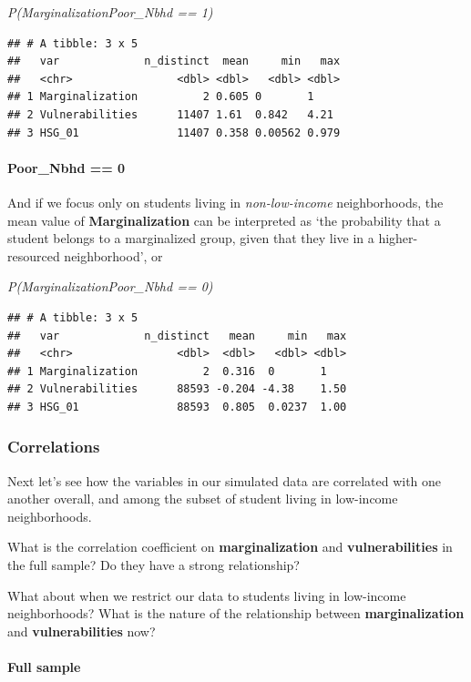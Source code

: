 \documentclass[
]{article}
\begin{document}
\emph{P(Marginalization\textbar Poor\_Nbhd == 1)}

\begin{verbatim}
## # A tibble: 3 x 5
##   var             n_distinct  mean     min   max
##   <chr>                <dbl> <dbl>   <dbl> <dbl>
## 1 Marginalization          2 0.605 0       1    
## 2 Vulnerabilities      11407 1.61  0.842   4.21 
## 3 HSG_01               11407 0.358 0.00562 0.979
\end{verbatim}

\paragraph{Poor\_Nbhd == 0}\label{poor_nbhd-0}

And if we focus only on students living in \emph{non-low-income}
neighborhoods, the mean value of \textbf{Marginalization} can be
interpreted as `the probability that a student belongs to a marginalized
group, given that they live in a higher-resourced neighborhood', or

\emph{P(Marginalization\textbar Poor\_Nbhd == 0)}

\begin{verbatim}
## # A tibble: 3 x 5
##   var             n_distinct   mean     min   max
##   <chr>                <dbl>  <dbl>   <dbl> <dbl>
## 1 Marginalization          2  0.316  0       1   
## 2 Vulnerabilities      88593 -0.204 -4.38    1.50
## 3 HSG_01               88593  0.805  0.0237  1.00
\end{verbatim}

\subsubsection{Correlations}\label{correlations}

Next let's see how the variables in our simulated data are correlated
with one another overall, and among the subset of student living in
low-income neighborhoods.

What is the correlation coefficient on \textbf{marginalization} and
\textbf{vulnerabilities} in the full sample? Do they have a strong
relationship?

What about when we restrict our data to students living in low-income
neighborhoods? What is the nature of the relationship between
\textbf{marginalization} and \textbf{vulnerabilities} now?

\paragraph{Full sample}\label{full-sample}
\end{document}

